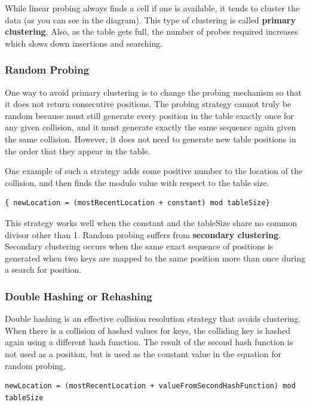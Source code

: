  While linear probing always finds a cell if one is available, it tends to cluster the data (as you can see in the diagram). This type of clustering is called \textbf{primary clustering}. Also,  as the table gets full, the number of probes required increases which slows down insertions and searching.
   
\subsubsection{Random Probing}


 One way to avoid primary clustering is to change the probing mechanism so that it does not return consecutive positions. The probing strategy cannot truly be random because must still generate every position in the table exactly once for any given collision, and it  must generate exactly the same sequence again given the same collision.  However, it does not  need to generate new table positions  in the order that they appear in the table.
   
One example of such a strategy adds some positive number  to the  location of the collision, and then finds the modulo value with respect to the table size.

\begin{lstlisting}
{ newLocation = (mostRecentLocation + constant) mod tableSize}
\end{lstlisting}


This strategy works well when the constant and the tableSize share no common divisor other than 1. Random probing suffers from \textbf{secondary clustering}.   Secondary clustering occurs when the same exact sequence of  positions is generated   when two keys are mapped to the same position more than once during a search for position. 
   


\subsubsection{Double Hashing or Rehashing}

Double hashing is an effective collision resolution strategy that avoids clustering. When there is a collision of hashed values for keys, the colliding key is hashed again using a different hash function.   The result of the second hash function is not used as a position, but is used as  the constant value in the equation for random probing.
   
\begin{lstlisting}
newLocation = (mostRecentLocation + valueFromSecondHashFunction) mod tableSize
\end{lstlisting}



